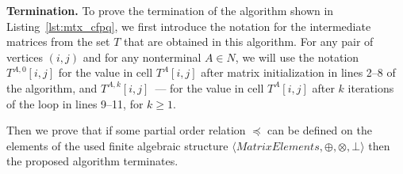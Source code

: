 \textbf{Termination.} %
To prove the termination of the algorithm shown in Listing~\ref{lst:mtx_cfpq}, we first introduce the notation for the intermediate matrices from the set $T$ that are obtained in this algorithm. For any pair of vertices $(i, j)$ and for any nonterminal $A \in N$, we will use the notation $T^{A, 0}[i, j]$ for the value in cell $T^{A}[i, j]$ after matrix initialization in lines 2--8 of the algorithm, and $T^{A, k}[i, j]$~--- for the value in cell $T^{A}[i, j] $ after $k$ iterations of the loop in lines 9--11, for $k \geq 1$.

Then we prove that if some partial order relation $\preceq$ can be defined on the elements of the used finite algebraic structure $\langle \textit{MatrixElements}, \oplus, \otimes, \bot \rangle$ then the proposed algorithm terminates.

